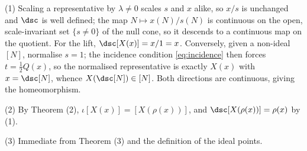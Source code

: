 (1) Scaling a representative by $\lambda \neq 0$ scales $s$ and $x$ alike, so $x/s$ is unchanged and $\dsc$ is well defined; the map $N \mapsto x(N)/s(N)$ is continuous on the open, scale-invariant set $\{s \neq 0\}$ of the null cone, so it descends to a continuous map on the quotient. For the lift, $\dsc[X(x)] = x/1 = x$. Conversely, given a non-ideal $[N]$, normalise $s = 1$; the incidence condition \eqref{eq:incidence} then forces $t = \tfrac12 Q(x)$, so the normalised representative is exactly $X(x)$ with $x = \dsc[N]$, whence $X(\dsc[N]) \in [N]$. Both directions are continuous, giving the homeomorphism.

(2) By Theorem (2), $\iota[X(x)] = [X(\rho(x))]$, and $\dsc[X(\rho(x))] = \rho(x)$ by (1).

(3) Immediate from Theorem (3) and the definition of the ideal points.
